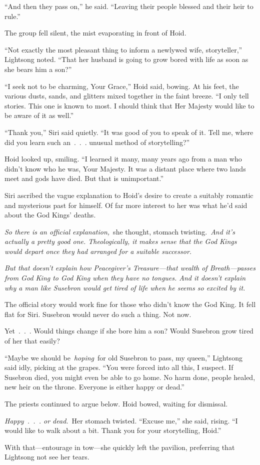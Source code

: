 “And then they pass on,” he said. “Leaving their people blessed and their heir to rule.”

The group fell silent, the mist evaporating in front of Hoid.

“Not exactly the most pleasant thing to inform a newlywed wife, storyteller,” Lightsong noted. “That her husband is going to grow bored with life as soon as she bears him a son?”

“I seek not to be charming, Your Grace,” Hoid said, bowing. At his feet, the various dusts, sands, and glitters mixed together in the faint breeze. “I only tell stories. This one is known to most. I should think that Her Majesty would like to be aware of it as well.”

“Thank you,” Siri said quietly. “It was good of you to speak of it. Tell me, where did you learn such an~.~.~. unusual method of storytelling?”

Hoid looked up, smiling. “I learned it many, many years ago from a man who didn’t know who he was, Your Majesty. It was a distant place where two lands meet and gods have died. But that is unimportant.”

Siri ascribed the vague explanation to Hoid’s desire to create a suitably romantic and mysterious past for himself. Of far more interest to her was what he’d said about the God Kings’ deaths.

\textit{So there is an official explanation,}~she thought, stomach twisting.~\textit{And it’s actually a pretty good one. Theologically, it makes sense that the God Kings would depart once they had arranged for a suitable successor.}

\textit{But that doesn’t explain how Peacegiver’s Treasure—that wealth of Breath—passes from God King to God King when they have no tongues. And it doesn’t explain why a man like Susebron would get tired of life when he seems so excited by it.}

The official story would work fine for those who didn’t know the God King. It fell flat for Siri. Susebron would never do such a thing. Not now.

Yet~.~.~. Would things change if she bore him a son? Would Susebron grow tired of her that easily?

“Maybe we should be~\textit{hoping}~for old Susebron to pass, my queen,” Lightsong said idly, picking at the grapes. “You were forced into all this, I suspect. If Susebron died, you might even be able to go home. No harm done, people healed, new heir on the throne. Everyone is either happy or dead.”

The priests continued to argue below. Hoid bowed, waiting for dismissal.

\textit{Happy~.~.~. or dead.}~Her stomach twisted. “Excuse me,” she said, rising. “I would like to walk about a bit. Thank you for your storytelling, Hoid.”

With that—entourage in tow—she quickly left the pavilion, preferring that Lightsong not see her tears.

